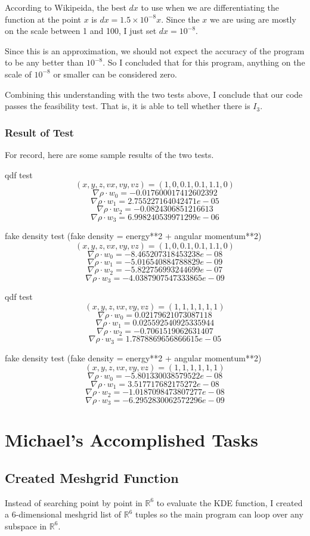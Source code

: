 \documentclass[12pt]{article}
\begin{document}
According to Wikipeida, the best $dx$ to use when we are differentiating the function at the point $x$ is $dx = 1.5 \times 10^{-8} x$. Since the $x$ we are using are mostly on the scale between 1 and 100, I just set $dx = 10^{-8}$.

Since this is an approximation, we should not expect the accuracy of the program to be any better than $10^{-8}$. So I concluded that for this program, anything on the scale of $10^{-8}$ or smaller can be considered zero.

Combining this understanding with the two tests above, I conclude that our code passes the feasibility test. That is, it is able to tell whether there is $I_3$.

\subsubsection{Result of Test}
For record, here are some sample results of the two tests.

qdf test
$$(x,  y, z, vx, vy, vz) = (1, 0, 0.1, 0.1, 1.1, 0)$$
$$\nabla \rho \cdot w_0 = -0.017600017412602392 $$
$$ \nabla \rho \cdot w_1 = 2.755227164042471e-05 $$
$$ \nabla \rho \cdot w_2 = -0.0824306851216613 $$
$$ \nabla \rho \cdot w_3 = 6.998240539971299e-06$$

fake density test (fake density = energy**2  + angular momentum**2)
$$(x,  y, z, vx, vy, vz) = (1, 0, 0.1, 0.1, 1.1, 0)$$
$$\nabla \rho \cdot w_0 = -8.465207318453238e-08$$
$$\nabla \rho \cdot w_1 = -5.016540884788829e-09$$
$$\nabla \rho \cdot w_2 = -5.822756993244699e-07$$
$$\nabla \rho \cdot w_3 = -4.0387907547333865e-09$$

qdf test
$$(x,  y, z, vx, vy, vz) = (1, 1, 1, 1, 1, 1)$$
$$\nabla \rho \cdot w_0 = 0.02179621073087118$$
$$\nabla \rho \cdot w_1 = 0.025592540925335944$$
$$\nabla \rho \cdot w_2 = -0.7061519062631407$$
$$\nabla \rho \cdot w_3 = 1.7878869656866615e-05$$

fake density test (fake density = energy**2  + angular momentum**2)
$$(x,  y, z, vx, vy, vz) = (1, 1, 1, 1, 1, 1)$$
$$\nabla \rho \cdot w_0 = -5.801330038579522e-08$$
$$\nabla \rho \cdot w_1 = 3.517717682175272e-08$$
$$\nabla \rho \cdot w_2 = -1.0187098473807277e-08$$
$$\nabla \rho \cdot w_3 = -6.2952830062572296e-09$$


\section{Michael's Accomplished Tasks}
\subsection{Created Meshgrid Function}
Instead of searching point by point in $\mathbb{R}^6$ to evaluate the KDE function, I created a 6-dimensional meshgrid list of $\mathbb{R}^6$ tuples so the main program can loop over any subspace in $\mathbb{R}^6$. 
\end{document}
